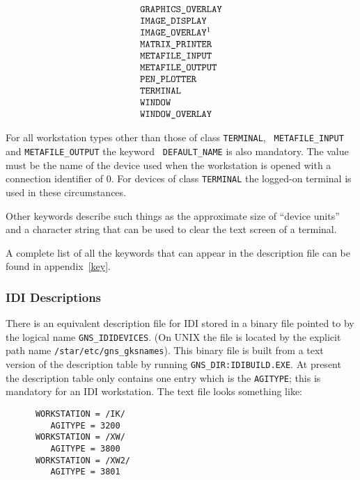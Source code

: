 \[\begin{tabular}{l}
\tt GRAPHICS\_OVERLAY\\
\tt IMAGE\_DISPLAY\\
\tt IMAGE\_OVERLAY\footnotemark\\
\tt MATRIX\_PRINTER\\
\tt METAFILE\_INPUT\\
\tt METAFILE\_OUTPUT\\
\tt PEN\_PLOTTER\\
\tt TERMINAL\\
\tt WINDOW\\
\tt WINDOW\_OVERLAY
\end{tabular}\]

For all workstation types other than those of class {\tt TERMINAL}, {\tt
METAFILE\_INPUT} and {\tt METAFILE\_OUTPUT} the keyword {\tt
DEFAULT\_NAME} is also mandatory. The value must be the name of the
device used when the workstation is opened with a connection identifier of
0. For devices of class {\tt TERMINAL} the logged-on terminal is used in
these circumstances. 

Other keywords describe such things as the
approximate size of ``device units'' and a character string that can be
used to clear the text screen of a terminal.

A complete list of all the keywords that can appear in the description file
can be found in appendix~\ref{key}.

\subsubsection{IDI Descriptions}

There is an equivalent description file for IDI stored in a binary file
pointed to by the logical name {\tt GNS\_IDIDEVICES}. 
(On UNIX the file is located by the explicit path name
{\tt /star/etc/gns\_gksnames}).
This binary file is built from a text version of the description table by
running {\tt GNS\_DIR:\-IDIBUILD.EXE}. At present the description table only
contains one entry which is the {\tt AGITYPE}; this is mandatory for an IDI
workstation. The text file looks something like:

\begin{verbatim}
      WORKSTATION = /IK/
         AGITYPE = 3200
      WORKSTATION = /XW/
         AGITYPE = 3800
      WORKSTATION = /XW2/
         AGITYPE = 3801
\end{verbatim}

